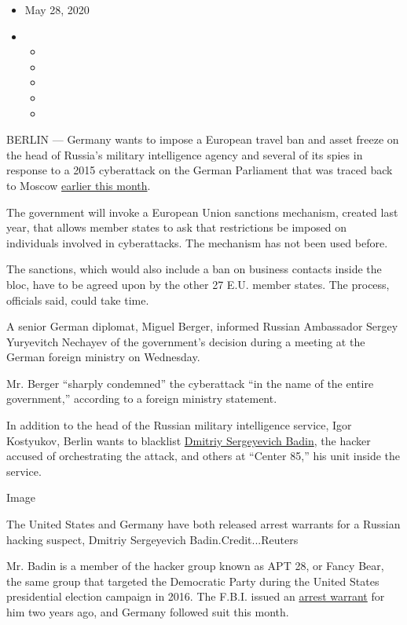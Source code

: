 \begin{itemize}
\item
  May 28, 2020
\item
  \begin{itemize}
  \item
  \item
  \item
  \item
  \item
  \end{itemize}
\end{itemize}

BERLIN --- Germany wants to impose a European travel ban and asset
freeze on the head of Russia's military intelligence agency and several
of its spies in response to a 2015 cyberattack on the German Parliament
that was traced back to Moscow
\href{https://www.nytimes.com/2020/05/13/world/europe/merkel-russia-cyberattack.html}{earlier
this month}.

The government will invoke a European Union sanctions mechanism, created
last year, that allows member states to ask that restrictions be imposed
on individuals involved in cyberattacks. The mechanism has not been used
before.

The sanctions, which would also include a ban on business contacts
inside the bloc, have to be agreed upon by the other 27 E.U. member
states. The process, officials said, could take time.

A senior German diplomat, Miguel Berger, informed Russian Ambassador
Sergey Yuryevitch Nechayev of the government's decision during a meeting
at the German foreign ministry on Wednesday.

Mr. Berger ``sharply condemned'' the cyberattack ``in the name of the
entire government,'' according to a foreign ministry statement.

In addition to the head of the Russian military intelligence service,
Igor Kostyukov, Berlin wants to blacklist
\href{https://www.fbi.gov/wanted/cyber/dmitriy-sergeyevich-badin}{Dmitriy
Sergeyevich Badin}, the hacker accused of orchestrating the attack, and
others at ``Center 85,'' his unit inside the service.

Image

The United States and Germany have both released arrest warrants for a
Russian hacking suspect, Dmitriy Sergeyevich Badin.Credit...Reuters

Mr. Badin is a member of the hacker group known as APT 28, or Fancy
Bear, the same group that targeted the Democratic Party during the
United States presidential election campaign in 2016. The F.B.I. issued
an
\href{https://www.fbi.gov/wanted/cyber/dmitriy-sergeyevich-badin}{arrest
warrant} for him two years ago, and Germany followed suit this month.

